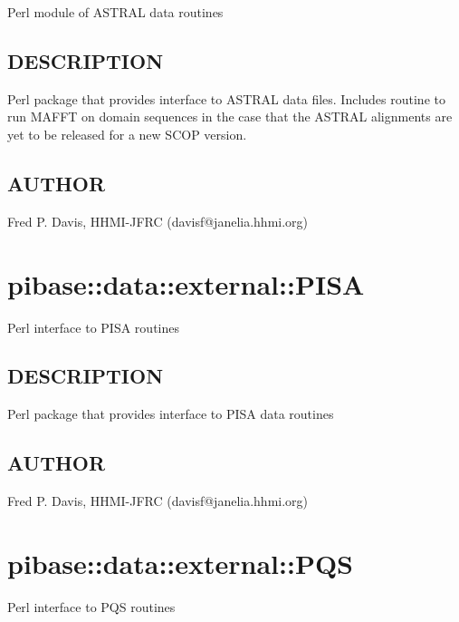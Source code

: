 \documentclass{article}
\begin{document}
Perl module of ASTRAL data routines

\subsection*{DESCRIPTION\label{pibase::data::external::ASTRAL_DESCRIPTION}}


Perl package that provides interface to ASTRAL data files. Includes routine
to run MAFFT on domain sequences in the case that the ASTRAL alignments
are yet to be released for a new SCOP version.

\subsection*{AUTHOR\label{pibase::data::external::ASTRAL_AUTHOR}}


Fred P. Davis, HHMI-JFRC (davisf@janelia.hhmi.org)

\clearpage
\section{pibase::data::external::PISA\label{pibase::data::external::PISA}}


Perl interface to PISA routines

\subsection*{DESCRIPTION\label{pibase::data::external::PISA_DESCRIPTION}}


Perl package that provides interface to PISA data routines

\subsection*{AUTHOR\label{pibase::data::external::PISA_AUTHOR}}


Fred P. Davis, HHMI-JFRC (davisf@janelia.hhmi.org)

\clearpage
\section{pibase::data::external::PQS\label{pibase::data::external::PQS}}


Perl interface to PQS routines
\end{document}
